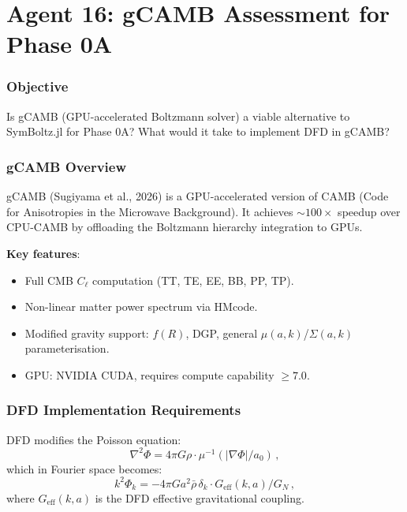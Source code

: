 \documentclass[11pt,a4paper]{article}
\begin{document}
\part{Agent 16: gCAMB Assessment for Phase 0A}
\label{part:gcamb}

\section{Objective}

Is gCAMB (GPU-accelerated Boltzmann solver) a viable alternative to SymBoltz.jl for Phase 0A? What would it take to implement DFD in gCAMB?

\section{gCAMB Overview}

gCAMB (Sugiyama et al., 2026) is a GPU-accelerated version of CAMB (Code for Anisotropies in the Microwave Background). It achieves $\sim 100\times$ speedup over CPU-CAMB by offloading the Boltzmann hierarchy integration to GPUs.

\textbf{Key features}:
\begin{itemize}
\item Full CMB $C_\ell$ computation (TT, TE, EE, BB, PP, TP).
\item Non-linear matter power spectrum via HMcode.
\item Modified gravity support: $f(R)$, DGP, general $\mu(a,k)$/$\Sigma(a,k)$ parameterisation.
\item GPU: NVIDIA CUDA, requires compute capability $\geq 7.0$.
\end{itemize}

\section{DFD Implementation Requirements}

DFD modifies the Poisson equation:
\begin{equation}
\nabla^2\Phi = 4\pi G \rho \cdot \mu^{-1}(|\nabla\Phi|/a_0)\,,
\end{equation}
which in Fourier space becomes:
\begin{equation}
k^2\Phi_k = -4\pi G a^2 \bar{\rho}\,\delta_k \cdot G_{\mathrm{eff}}(k, a)/G_N\,,
\end{equation}
where $G_{\mathrm{eff}}(k, a)$ is the DFD effective gravitational coupling.
\end{document}

